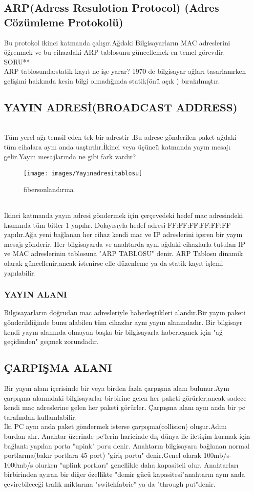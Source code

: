  \subsection*{ARP(Adress Resulotion Protocol) (Adres Cözümleme Protokolü)}
 Bu protokol ikinci katmanda çalışır.Ağdaki Bilgisayarların MAC adreslerini öğrenmek ve bu cihazdaki ARP tablosunu güncellemek en temel görevdir.
 SORU**\\
 ARP tablosunda;statik kayıt ne işe yarar?
 1970 de bilgisayar ağları tasarlanırken gelişimi hakkında kesin bilgi olmadığında statik(önü açık ) bırakılmıştır.
 \subsection*{YAYIN ADRESİ(BROADCAST ADDRESS)}\\ 
 Tüm yerel ağı temsil eden tek bir adrestir .Bu adrese gönderilen paket ağdaki tüm cihalara aynı anda uaştırılır.İkinci veya üçüncü katmanda yayın mesajı gelir.Yayın mesajlarında ne gibi fark vardır?
 \begin{figure}[!ht]
  \texttt{[image: images/Yayınadresitablosu]}
 \caption{fibersonlandırma}
 \label{fig:fosonlandırma}
\end{figure}
\\
İkinci katmanda yayın adresi göndermek için çerçevedeki hedef mac adresindeki kısmında tüm bitler 1 yapılır.
Dolayısıyla hedef  adresi FF:FF:FF:FF:FF:FF yapılır.Ağa yeni bağlanan her cihaz kendi mac ve IP adreslerini içeren bir yayın mesajı gönderir.
Her bilgisayarda ve anahtarda aynı ağdaki cihazlarla tutulan IP ve MAC adreslerinin tablosuna "ARP TABLOSU" denir. ARP Tablosu dinamik olarak güncellenir,ancak istenirse elle düzenleme ya da statik kayıt işlemi yapılabilir.
\subsubsection*{YAYIN ALANI}
Bilgisayarların doğrudan mac adresleriyle haberleştikleri alandır.Bir yayın paketi gönderildiğinde bunu alabilen tüm cihazlar aynı yayın alanındadır.
Bir bilgisayr kendi yayın alanında olmayan başka bir bilgisayarla haberleşmek için "ağ geçidinden" geçmek zorundadır.
\subsection*{ÇARPIŞMA ALANI}
Bir yayın alanı içerisinde bir veya birden fazla çarpışma alanı bulunur.Aynı çarpışma alanındaki bilgisayarlar birbirine gelen her paketi görürler,ancak sadece kendi mac adreslerine gelen her paketi görürler.
Çarpışma alanı aynı anda bir pc tarafından kullanılabilir.\\
İki PC aynı anda paket göndermek isterse çarpışma(collision) oluşur.Adını burdan alır.
Anahtar üzerinde pc'lerin haricinde dış dünya ile iletişim kurmak için bağlantı yapılan porta "upink" poru denir.
Anahtarın bilgisayara bağlanan normal portlarına(bakır portlara 45 port) "giriş portu" denir.Genel olarak 100mb/s-1000mb/s  olurken "uplink portları" genellikle daha kapasiteli olur.
Anahtarları birbirinden ayıran bir diğer özellikte "demir gücü kapasitesi"anahtarın aynı  anda çevirebileceği trafik miktarına "switchfabric" ya da "through put"denir.
